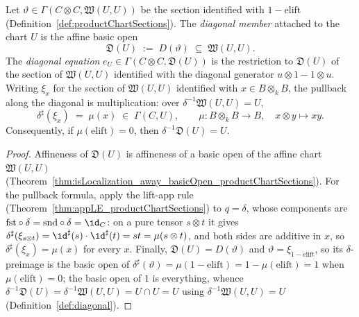 \begin{definition}
  \label{def:diagonalChart}
  \leanok
  Let \(\vartheta \in \Gamma(C \otimes C, \mathfrak W(U,U))\) be the section identified with
  \(1 - \mathrm{elift}\) (Definition~\ref{def:productChartSections}). The \emph{diagonal member}
  attached to the chart \(U\) is the affine basic open
  \[
    \mathfrak D(U) \;:=\; D(\vartheta) \;\subseteq\; \mathfrak W(U,U).
  \]
  The \emph{diagonal equation} \(e_U \in \Gamma(C \otimes C, \mathfrak D(U))\) is the restriction
  to \(\mathfrak D(U)\) of the section of \(\mathfrak W(U,U)\) identified with the diagonal
  generator \(u \otimes 1 - 1 \otimes u\). Writing \(\xi_x\) for the section of
  \(\mathfrak W(U,U)\) identified with \(x \in B \otimes_k B\), the pullback along the diagonal is
  multiplication: over \(\delta^{-1}\mathfrak W(U,U) = U\),
  \[
    \delta^\sharp(\xi_x) \;=\; \mu(x) \;\in\; \Gamma(C, U), \qquad
    \mu \colon B \otimes_k B \to B, \quad x \otimes y \mapsto xy .
  \]
  Consequently, if \(\mu(\mathrm{elift}) = 0\), then \(\delta^{-1}\mathfrak D(U) = U\).
\end{definition}
\begin{proof}
  \leanok
  Affineness of \(\mathfrak D(U)\) is affineness of a basic open of the affine chart
  \(\mathfrak W(U,U)\) (Theorem~\ref{thm:isLocalization_away_basicOpen_productChartSections}). For
  the pullback formula, apply the lift-app rule (Theorem~\ref{thm:appLE_productChartSections}) to
  \(q = \delta\), whose components are \(\mathrm{fst} \circ \delta = \mathrm{snd} \circ \delta = \id_C\):
  on a pure tensor \(s \otimes t\) it gives
  \(\delta^\sharp(\xi_{s \otimes t}) = \id^\sharp(s) \cdot \id^\sharp(t) = st = \mu(s \otimes t)\),
  and both sides are additive in \(x\), so \(\delta^\sharp(\xi_x) = \mu(x)\) for every \(x\).
  Finally, \(\mathfrak D(U) = D(\vartheta)\) and \(\vartheta = \xi_{1 - \mathrm{elift}}\), so its
  \(\delta\)-preimage is the basic open of
  \(\delta^\sharp(\vartheta) = \mu(1 - \mathrm{elift}) = 1 - \mu(\mathrm{elift}) = 1\) when
  \(\mu(\mathrm{elift}) = 0\); the basic open of \(1\) is everything, whence
  \(\delta^{-1}\mathfrak D(U) = \delta^{-1}\mathfrak W(U,U) = U \cap U = U\) using
  \(\delta^{-1}\mathfrak W(U,U) = U\) (Definition~\ref{def:diagonal}).
\end{proof}


